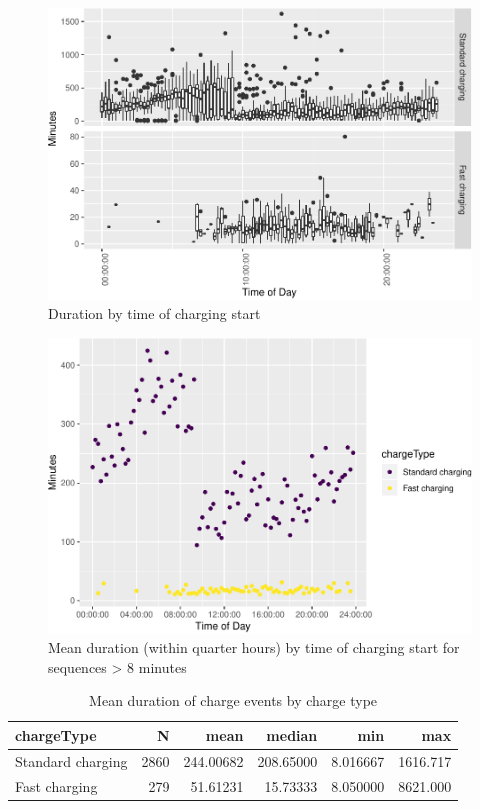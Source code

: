 \documentclass[]{article}
\begin{document}
\begin{figure}
\centering
\includegraphics{EVBB_report_files/figure-latex/durationTimeBox-1.pdf}
\caption{\label{fig:durationTimeBox}Duration by time of charging start}
\end{figure}

\begin{figure}
\centering
\includegraphics{EVBB_report_files/figure-latex/durationTimeMean-1.pdf}
\caption{\label{fig:durationTimeMean}Mean duration (within quarter hours) by
time of charging start for sequences \textgreater{} 8 minutes}
\end{figure}

\begin{table}[t]

\caption{\label{tab:meanDurationTable}Mean duration of charge events by charge type}
\centering
\begin{tabular}{l|r|r|r|r|r}
\hline
chargeType & N & mean & median & min & max\\
\hline
Standard charging & 2860 & 244.00682 & 208.65000 & 8.016667 & 1616.717\\
\hline
Fast charging & 279 & 51.61231 & 15.73333 & 8.050000 & 8621.000\\
\hline
\end{tabular}
\end{table}
\end{document}
